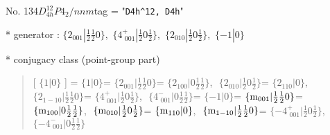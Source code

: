 \documentclass[fleqn,10pt,landscape]{jsarticle}
\begin{document}
\newpage

No. 134\quad$D_{4h}^{12}$\quad$P4_2/nnm$\quad[ tetragonal ]
tag = "{\tt D4h^12, D4h}"

* generator : $\{2{}_{001}|\frac{1}{2} \frac{1}{2} 0\},\,\,\{4^{+}_{\,\,001}|\frac{1}{2} 0 \frac{1}{2}\},\,\,\{2{}_{010}|\frac{1}{2} 0 \frac{1}{2}\},\,\,\{-1|0\}$

* conjugacy class (point-group part)
\begin{quote}
[ $\{1|0\}$ ] = \quad $\{1|0\}$ = \quad $\{2{}_{001}|\frac{1}{2} \frac{1}{2} 0\}$ = \quad $\{2{}_{100}|0 \frac{1}{2} \frac{1}{2}\}$,\,\, $\{2{}_{010}|\frac{1}{2} 0 \frac{1}{2}\}$\newline[ $\{2{}_{110}|0\}$ ] = \quad $\{2{}_{110}|0\}$,\,\, $\{2{}_{1-10}|\frac{1}{2} \frac{1}{2} 0\}$ = \quad $\{4^{+}_{\,\,001}|\frac{1}{2} 0 \frac{1}{2}\}$,\,\, $\{4^{-}_{\,\,001}|0 \frac{1}{2} \frac{1}{2}\}$\newline[ $\{-1|0\}$ ] = \quad $\{-1|0\}$ = \quad $\{{\rm m}_{001}|\frac{1}{2} \frac{1}{2} 0\}$ = \quad $\{{\rm m}_{100}|0 \frac{1}{2} \frac{1}{2}\}$,\,\, $\{{\rm m}_{010}|\frac{1}{2} 0 \frac{1}{2}\}$\newline[ $\{{\rm m}_{110}|0\}$ ] = \quad $\{{\rm m}_{110}|0\}$,\,\, $\{{\rm m}_{1-10}|\frac{1}{2} \frac{1}{2} 0\}$ = \quad $\{-4^{+}_{\,\,001}|\frac{1}{2} 0 \frac{1}{2}\}$,\,\, $\{-4^{-}_{\,\,001}|0 \frac{1}{2} \frac{1}{2}\}$\newline
\end{quote}
\end{document}
